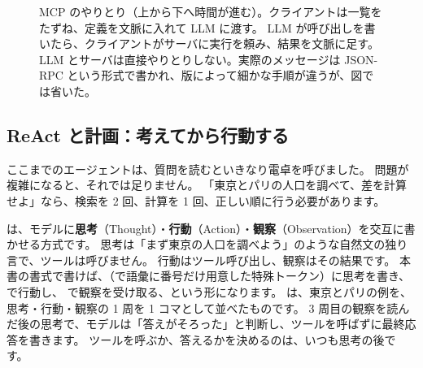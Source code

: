 \begin{figure}[tbp]
\centering
{}
\caption{MCP のやりとり（上から下へ時間が進む）。クライアントは一覧をたずね、定義を文脈に入れて LLM に渡す。
LLM が呼び出しを書いたら、クライアントがサーバに実行を頼み、結果を文脈に足す。
LLM とサーバは直接やりとりしない。実際のメッセージは JSON-RPC という形式で書かれ、版によって細かな手順が違うが、図では省いた。}
\label{fig:agent-mcp}
\end{figure}

\subsection{ReAct と計画：考えてから行動する}

ここまでのエージェントは、質問を読むといきなり電卓を呼びました。
問題が複雑になると、それでは足りません。
「東京とパリの人口を調べて、差を計算せよ」なら、検索を 2 回、計算を 1 回、正しい順に行う必要があります。

\cite{yao2023react}は、モデルに\textbf{思考}（Thought）・\textbf{行動}（Action）・\textbf{観察}（Observation）を交互に書かせる方式です。
思考は「まず東京の人口を調べよう」のような自然文の独り言で、ツールは呼びません。
行動はツール呼び出し、観察はその結果です。
本書の書式で書けば、（で語彙に番号だけ用意した特殊トークン）に思考を書き、 で行動し、 で観察を受け取る、という形になります。
は、東京とパリの例を、思考・行動・観察の 1 周を 1 コマとして並べたものです。
3 周目の観察を読んだ後の思考で、モデルは「答えがそろった」と判断し、ツールを呼ばずに最終応答を書きます。
ツールを呼ぶか、答えるかを決めるのは、いつも思考の後です。

